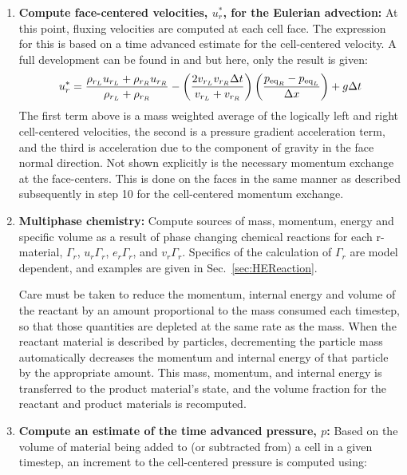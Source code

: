 \begin{enumerate}
\item {\bf Compute face-centered velocities, $u^*_r$, for the 
           Eulerian advection:}
At this point, fluxing velocities are computed at each cell face.  The 
expression for this is based on a time advanced estimate for the cell-centered 
velocity.  A full development can be found in  \cite{Kashiwa1994a} and 
\cite{Kashiwa2000} but here, only the result is given:
\begin{equation}
u^*_r = \frac{\rho_{r_L} u_{r_L} + \rho_{r_R} u_{r_R}}
                {\rho_{r_L} + \rho_{r_R}} -
           \left( \frac{2 v_{r_L} v_{r_R} \Delta{t}}
                       {v_{r_L} + v_{r_R}}\right)
           \left( \frac{p_{{\text{eq}}_R} - p_{{\text{eq}}_L}}{\Delta{x}}\right) + g\Delta{t}
\end{equation}
The first term above is a mass weighted average of the logically left and right
cell-centered velocities, the second is a pressure gradient acceleration
term, and the third is acceleration due to the component of gravity in the face 
normal direction.  Not shown explicitly is the necessary momentum exchange at the
face-centers.  This is done on the faces in the same manner as described subsequently
in step 10 for the cell-centered momentum exchange.

\item {\bf Multiphase chemistry:} Compute sources of mass, momentum, energy
and specific volume as a result of phase changing chemical reactions for 
each r-material, $\Gamma_r$, $u_r \Gamma_r$, $e_r \Gamma_r$,
and $v_r \Gamma_r$.  Specifics of the calculation of $\Gamma_r$ are 
model dependent, and examples are given in Sec.~\ref{sec:HEReaction}.

Care must be taken to reduce the momentum, internal energy and volume of the 
reactant by an amount proportional to the mass consumed each timestep, so that 
those quantities are depleted at the same rate as the mass.  When the reactant 
material is described by particles, decrementing
the particle mass automatically decreases the momentum and internal energy
of that particle by the appropriate amount. This mass, momentum, 
and internal energy is transferred to the product material's state, 
and the volume fraction for the reactant and product materials is recomputed.

\item {\bf Compute an estimate of the time advanced pressure, $p$:}  Based on
the volume of material being added to (or subtracted from) a cell in a given 
timestep, an increment to the cell-centered pressure is computed using:


\end{enumerate}
